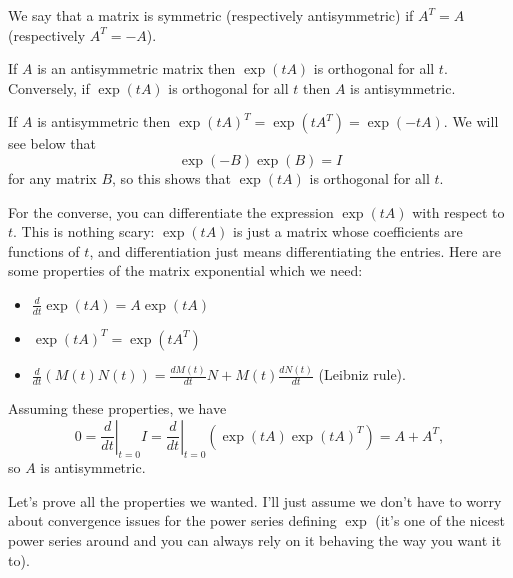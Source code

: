 \documentclass{article}
\begin{document}
\begin{Definition}
We say that a matrix is symmetric (respectively antisymmetric) if
\(A^T=A\) (respectively \(A^T=-A\)).


\end{Definition}
\begin{Theorem}
If \(A\) is an antisymmetric matrix then \(\exp(tA)\) is
orthogonal for all \(t\). Conversely, if \(\exp(tA)\) is
orthogonal for all \(t\) then \(A\) is antisymmetric.
\end{Theorem}
\begin{Proof}
If \(A\) is antisymmetric then
\(\exp(tA)^T=\exp(tA^T)=\exp(-tA)\). We will see below that
\[\exp(-B)\exp(B)=I\] for any matrix \(B\), so this shows that
\(\exp(tA)\) is orthogonal for all \(t\).


For the converse, you can differentiate the expression \(\exp(tA)\)
with respect to \(t\). This is nothing scary: \(\exp(tA)\) is just a
matrix whose coefficients are functions of \(t\), and
differentiation just means differentiating the entries. Here are
some properties of the matrix exponential which we need:
\begin{itemize}
\item \(\frac{d}{dt}\exp(tA)=A\exp(tA)\)
\item \(\exp(tA)^T=\exp(tA^T)\)
\item \(\frac{d}{dt}(M(t)N(t))=\frac{dM(t)}{dt}N+M(t)\frac{dN(t)}{dt}\)
(Leibniz rule).
\end{itemize}
Assuming these properties, we have
\[0=\left.\frac{d}{dt}\right|_{t=0}I=
\left.\frac{d}{dt}\right|_{t=0}(\exp(tA)\exp(tA)^T)=A+A^T,\]
so \(A\) is antisymmetric. \qedhere


\end{Proof}
Let's prove all the properties we wanted. I'll just assume we don't
have to worry about convergence issues for the power series defining
\(\exp\) (it's one of the nicest power series around and you can
always rely on it behaving the way you want it to).
\end{document}
